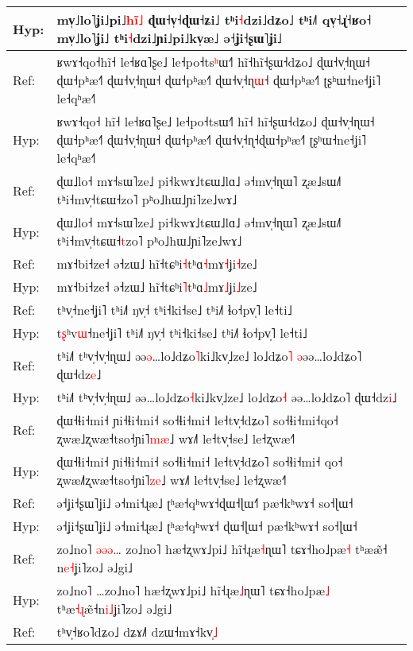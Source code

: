 \documentclass[10pt]{article}
\DeclareRobustCommand{\hl}[1]{{\textcolor{red}{#1}}}
\begin{document}
\begin{longtable}{ll}
Hyp: & mv̩˩lo˥ʝi˩pi˩\hl{h}\hl{i}\hl{̃}\hl{˩} ɖɯ˧v̩˧ɖɯ˧ʑi˩\hl{ }tʰi\hl{˧}dzi˩dʑo˩ tʰi˩˥ qv̩˧ɻ̍˧ʁo˧ mv̩˩lo˥ʝi˩\hl{ }tʰi\hl{˧}dzi˩ɲi˩pi˩kv̩æ˩ ə˧ʝi˧ʂɯ˥ʝi˩ \\ 
\midrule 
Ref: & ʁwɤ˧qo˧hĩ˧ le˧ʁɑ˥ʂe˩ le˧po˧ts\hl{ʰ}ɯ˧˥ hĩ˧hĩ˧ʂɯ˧dʑo˩ ɖɯ˧v̩˧ɳɯ˧ ɖɯ˧pʰæ˧˥ ɖɯ˧v̩˧ɳɯ˧ ɖɯ˧pʰæ˧˥ ɖɯ˧v̩˧ɳ\hl{ɯ}˧\hl{ }ɖɯ˧pʰæ˧˥ ʈʂʰɯ˧ne˧ʝi˥ le˧qʰæ˧˥ \\ 
Hyp: & ʁwɤ˧qo˧\hl{ }hĩ˧ le˧ʁɑ˥ʂe˩ le˧po˧tsɯ˧˥ hĩ˧\hl{ }hĩ˧ʂɯ˧dʑo˩ ɖɯ˧v̩˧ɳɯ˧ ɖɯ˧pʰæ˧˥ ɖɯ˧v̩˧ɳɯ˧ ɖɯ˧pʰæ˧˥ ɖɯ˧v̩˧ɳ˧ɖɯ˧pʰæ˧˥ ʈʂʰɯ˧ne˧ʝi˥ le˧qʰæ˧˥ \\ 
\midrule 
Ref: & ɖɯ˩lo˧ mɤ˧sɯ˥ze˩ pi˧kwɤ˩tɕɯ˩lɑ˩ ə˧mv̩˧ɳɯ˥ ʐæ˩sɯ˩˥ tʰi˧mv̩˧tɕɯ˧zo˥ pʰo˩hɯ˩ɲi˥ze˩wɤ˩ \\ 
Hyp: & ɖɯ˩lo˧ mɤ˧sɯ˥ze˩ pi˧kwɤ˩tɕɯ˩lɑ˩ ə˧mv̩˧ɳɯ˥ ʐæ˩sɯ˩˥ tʰi˧mv̩˧tɕɯ˧\hl{t}zo˥ pʰo˩hɯ˩ɲi˥ze˩wɤ˩ \\ 
\midrule 
Ref: & mɤ˧bi˧ze˧ ə˧zɯ˩ hĩ˧tɕʰi\hl{˧}tʰɑ\hl{˧}mɤ\hl{˧}ʝi\hl{˧}ze˩ \\ 
Hyp: & mɤ˧bi˧ze˧ ə˧zɯ˩ hĩ˧tɕʰi\hl{˥}tʰɑ\hl{˩}mɤ\hl{˩}ʝi\hl{˩}ze˩ \\ 
\midrule 
Ref: & tʰv\hl{̩}˧ne˧ʝi˥ tʰi˩˥ ŋv̩˧ tʰi˧ki˧se˩ tʰi˩˥ ɬo˧pv̩˥ le˧ti˩ \\ 
Hyp: & t\hl{ʂ}ʰv\hl{ɯ}˧ne˧ʝi˥ tʰi˩˥ ŋv̩˧ tʰi˧ki˧se˩ tʰi˩˥ ɬo˧pv̩˥ le˧ti˩ \\ 
\midrule 
Ref: & tʰi˩˥ tʰv̩˧v̩˧ɳɯ˩ əə\hl{ə}…lo˩dʑo\hl{˥}ki˩kv̩˩ze˩ lo˩dʑo\hl{˥} \hl{ə}əə…lo˩dʑo˥ ɖɯ˧dz\hl{e}˩ \\ 
Hyp: & tʰi˩˥ tʰv̩˧v̩˧ɳɯ˩ əə…lo˩dʑo\hl{˧}ki˩kv̩˩ze˩ lo˩dʑo\hl{˧} əə…lo˩dʑo˥ ɖɯ˧dz\hl{i}˩ \\ 
\midrule 
Ref: & ɖɯ˧ɬi˧mi˧ ɲi˧ɬi˧mi˧ so˧ɬi˧mi˧ le˧tv̩˧dʑo˥ so˧ɬi˧mi˧qo˧ ʐwæ˩ʐwæ˧tso˧ɲi˥\hl{m}\hl{æ}˩ wɤ˩˥ le˧tv̩˧se˩ le˧ʐwæ˧˥ \\ 
Hyp: & ɖɯ˧ɬi˧mi˧ ɲi˧ɬi˧mi˧ so˧ɬi˧mi˧ le˧tv̩˧dʑo˥ so˧ɬi˧mi˧\hl{ }qo˧ ʐwæ˩\hl{˥}ʐwæ˧tso˧ɲi˥\hl{z}\hl{e}˩ wɤ˩˥ le˧tv̩˧se˩ le˧ʐwæ˧˥ \\ 
\midrule 
Ref: & ə˧ʝi˧ʂɯ˥ʝi˩ ə˧mi˧ɻæ˩ ʈʰæ˧qʰwɤ˧ɖɯ˧ɭɯ˧\hl{˥} pæ˧kʰwɤ˧ so˧ɭɯ˧ \\ 
Hyp: & ə˧ʝi˧ʂɯ˥ʝi˩ ə˧mi˧ɻæ˩ ʈʰæ˧qʰwɤ˧\hl{ }ɖɯ˧ɭɯ˧ pæ˧kʰwɤ˧ so˧ɭɯ˧ \\ 
\midrule 
Ref: & zo˩no˥ \hl{ə}\hl{ə}\hl{ə}…\hl{ }zo˩no˥ hæ˧ʐwɤ˩pi˩ hĩ˧ɻæ\hl{˧}ɳɯ˥ tɕɤ˧ho˩pæ\hl{˧} tʰææ̃˧\hl{ }n\hl{e}\hl{˧}ʝi˥zo˩ ə˩gi˩ \\ 
Hyp: & zo˩no˥ …zo˩no˥ hæ˧ʐwɤ˩pi˩ hĩ˧ɻæ\hl{˩}ɳɯ˥ tɕɤ˧ho˩pæ\hl{˩} tʰæ\hl{˧}\hl{ɻ}æ̃˧n\hl{i}\hl{˩}ʝi˥zo˩ ə˩gi˩ \\ 
\midrule 
Ref: & tʰv̩˧ʁo˥dʑo˩ dʑɤ˩˥ dzɯ˧mɤ˧kv̩\hl{˩} \\ 

\end{longtable}
\end{document}
